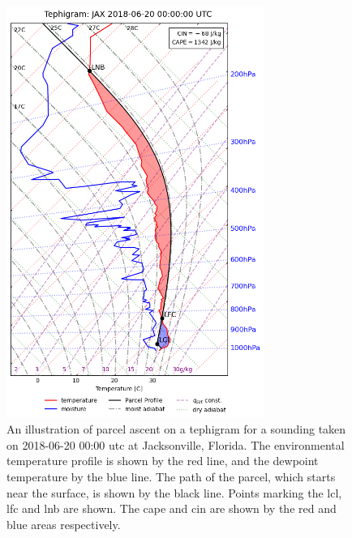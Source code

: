 \begin{figure}[tp]
    \centering
    \includegraphics[width=0.75\textwidth]{figures/example_tephigram.png}
    \caption[
    An illustration of parcel ascent on a tephigram for a sounding taken on 2018-06-20 00:00 \acrshort{utc} at Jacksonville, Florida
    ]{
    An illustration of parcel ascent on a tephigram for a sounding taken on 2018-06-20 00:00 \acrshort{utc} at Jacksonville, Florida. The environmental temperature profile is shown by the red line, and the dewpoint temperature by the blue line. The path of the parcel, which starts near the surface, is shown by the black line. Points marking the \acrshort{lcl}, \acrshort{lfc} and \acrshort{lnb} are shown. The \acrshort{cape} and \acrshort{cin} are shown by the red and blue areas respectively.
    }
    \label{fig:parcel_ascent}
\end{figure}

